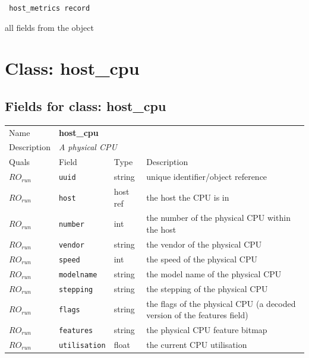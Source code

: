 \vspace{0.3cm}

{\tt 
host\_metrics record
}


all fields from the object
\vspace{0.3cm}
\vspace{0.3cm}
\vspace{0.3cm}

\vspace{1cm}
\newpage
\section{Class: host\_cpu}
\subsection{Fields for class: host\_cpu}
\begin{longtable}{|lllp{}|}
\hline
\multicolumn{1}{|l}{Name} & \multicolumn{3}{l|}{\bf host\_cpu} \\
\multicolumn{1}{|l}{Description} & \multicolumn{3}{l|}{\parbox{11cm}{\em A physical CPU}} \\
\hline
Quals & Field & Type & Description \\
\hline
$\mathit{RO}_\mathit{run}$ &  {\tt uuid} & string & unique identifier/object reference \\
$\mathit{RO}_\mathit{run}$ &  {\tt host} & host ref & the host the CPU is in \\
$\mathit{RO}_\mathit{run}$ &  {\tt number} & int & the number of the physical CPU within the host \\
$\mathit{RO}_\mathit{run}$ &  {\tt vendor} & string & the vendor of the physical CPU \\
$\mathit{RO}_\mathit{run}$ &  {\tt speed} & int & the speed of the physical CPU \\
$\mathit{RO}_\mathit{run}$ &  {\tt modelname} & string & the model name of the physical CPU \\
$\mathit{RO}_\mathit{run}$ &  {\tt stepping} & string & the stepping of the physical CPU \\
$\mathit{RO}_\mathit{run}$ &  {\tt flags} & string & the flags of the physical CPU (a decoded version of the features field) \\
$\mathit{RO}_\mathit{run}$ &  {\tt features} & string & the physical CPU feature bitmap \\
$\mathit{RO}_\mathit{run}$ &  {\tt utilisation} & float & the current CPU utilisation \\
\hline
\end{longtable}
